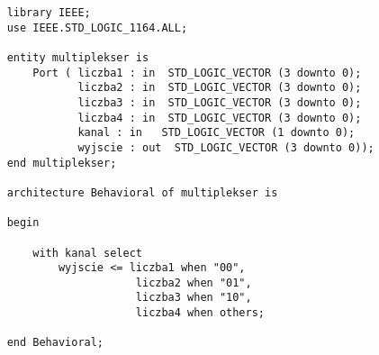 \begin{lstlisting}
    library IEEE;
    use IEEE.STD_LOGIC_1164.ALL;
    
    entity multiplekser is
        Port ( liczba1 : in  STD_LOGIC_VECTOR (3 downto 0);
               liczba2 : in  STD_LOGIC_VECTOR (3 downto 0);
               liczba3 : in  STD_LOGIC_VECTOR (3 downto 0);
               liczba4 : in  STD_LOGIC_VECTOR (3 downto 0);
               kanal : in	STD_LOGIC_VECTOR (1 downto 0);
               wyjscie : out  STD_LOGIC_VECTOR (3 downto 0));
    end multiplekser;
    
    architecture Behavioral of multiplekser is
    
    begin
    
        with kanal select
            wyjscie <= liczba1 when "00",
                        liczba2 when "01",
                        liczba3 when "10",
                        liczba4 when others;
    
    end Behavioral;
\end{lstlisting}